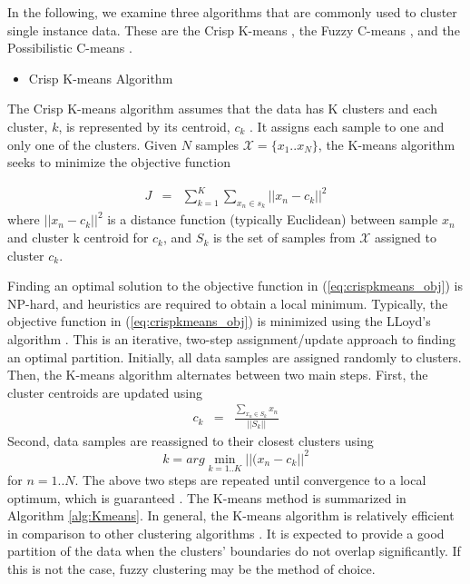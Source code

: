 \documentclass[12pt,dvips]{report}
\numberwithin{equation}{section}
\begin{document}
In the following, we examine three algorithms that are commonly used to cluster single instance data.  These are the Crisp K-means \cite{macqueen1967kmeans}, the Fuzzy C-means \cite{bezdek1981}, and the Possibilistic C-means \cite{PCM}.

\begin{itemize}[leftmargin=12 pt]
\item Crisp K-means Algorithm
\end{itemize}

The Crisp K-means algorithm assumes that the data has K clusters and each cluster, $k$, is represented by its centroid, $c_{k}$  \cite{macqueen1967kmeans}.  It assigns each sample to one and only one of the clusters.  Given $N$ samples $\mathcal{X}=\{x_{1}..x_{N}\}$, the K-means algorithm  seeks to minimize the objective function 

\begin{eqnarray}  \label{eq:crispkmeans_obj}
J & = & \sum_{k=1}^{K}\sum_{x_{n} \in s_{k}} \vert \vert x_{n}-c_{k}\vert \vert ^{2}
\end{eqnarray} where $ \vert \vert x_{n}-c_{k}\vert \vert ^{2}$ is a distance function (typically Euclidean) between sample $x_{n}$ and cluster k centroid for $c_{k}$, and  $S_{k}$ is the set of samples from $\mathcal{X}$ assigned to cluster $c_{k}$. 

Finding an optimal solution to the objective function in (\ref{eq:crispkmeans_obj}) is NP-hard, and heuristics are required to obtain a local minimum.  Typically, the objective function in (\ref{eq:crispkmeans_obj}) is minimized using the LLoyd's algorithm \cite{lloyd1982least}.  This is an iterative, two-step assignment/update approach to finding an optimal partition.  Initially, all data samples are assigned  randomly to clusters.  Then, the K-means algorithm alternates between two main steps.  First, the cluster centroids are updated using
\begin{eqnarray}  \label{eq:crispkmeans_centroids}
c_{k}  & = & \frac{\sum_{x_{n} \in S_{k}}x_{n}}{\vert \vert S_{k}\vert \vert }
\end{eqnarray} Second, data samples are reassigned to their closest clusters using 
\begin{equation} \label{eq:crispkmeans_mem}
k=arg\!\min\limits_{k=1..K}\vert \vert (x_{n}-c_{k}\vert \vert ^{2}
\end{equation} for $n=1..N$. The above two steps are repeated until convergence to a local optimum, which is guaranteed \cite{lloyd1982least}.  The K-means method is summarized in Algorithm \ref{alg:Kmeans}.  In general, the K-means algorithm is relatively efficient in comparison to other clustering algorithms \cite{bishop2006pattern}.  It is expected to provide a good partition of the data when the clusters' boundaries do not overlap significantly.  If this is not the case, fuzzy clustering may be the method of choice.
\end{document}
